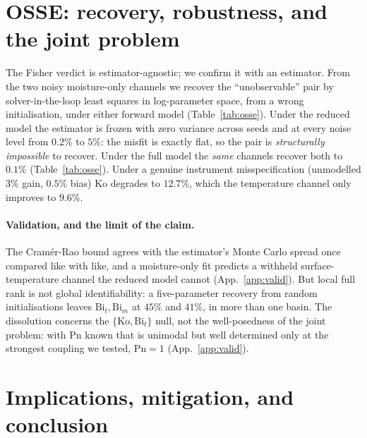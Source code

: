 \documentclass{article}
\begin{document}
\section{OSSE: recovery, robustness, and the joint problem}\label{sec:osse}
The Fisher verdict is estimator-agnostic; we confirm it with an estimator. From the two noisy
moisture-only channels we recover the ``unobservable'' pair by solver-in-the-loop least squares in
log-parameter space, from a wrong initialisation, under either forward model
(Table~\ref{tab:osse}). Under the reduced model the estimator is frozen with zero variance across
seeds and at every noise level from $0.2\%$ to $5\%$: the misfit is exactly flat, so the pair is
\emph{structurally impossible} to recover. Under the full model the \emph{same} channels recover
both to $0.1\%$ (Table~\ref{tab:osse}). Under a genuine instrument
misspecification (unmodelled $3\%$ gain, $0.5\%$ bias) $\mathrm{Ko}$ degrades to $12.7\%$, which the
temperature channel only improves to $9.6\%$.

\paragraph{Validation, and the limit of the claim.} The Cram\'er-Rao bound agrees with the
estimator's Monte Carlo spread once compared like with like, and a moisture-only fit predicts a
withheld surface-temperature channel the reduced model cannot (App.~\ref{app:valid}). But local full
rank is not global identifiability: a five-parameter recovery from random initialisations leaves
$\mathrm{Bi}_t,\mathrm{Bi}_m$ at $45\%$ and $41\%$, in more than one basin. The dissolution concerns
the $\{\mathrm{Ko},\mathrm{Bi}_t\}$ null, not the well-posedness of the joint problem: with
$\mathrm{Pn}$ known that is unimodal but well determined only at the strongest coupling we tested,
$\mathrm{Pn}{=}1$ (App.~\ref{app:valid}).

\section{Implications, mitigation, and conclusion}\label{sec:impl}
\end{document}
